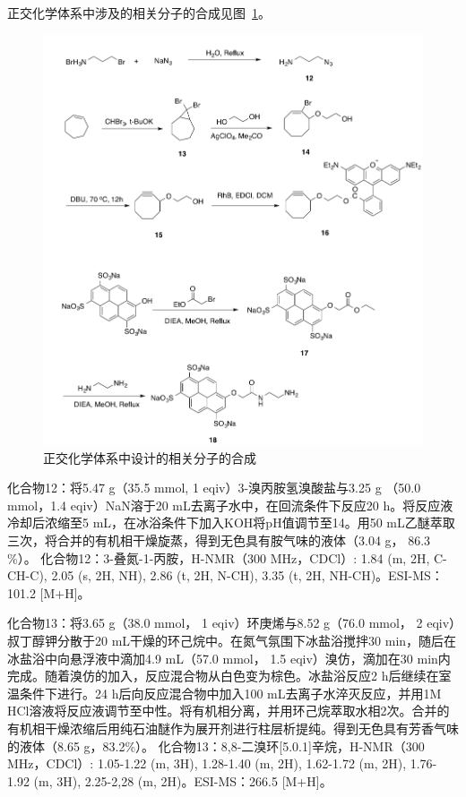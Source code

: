正交化学体系中涉及的相关分子的合成见图~\ref{fig:synth-orthognal}。
\begin{figure}[htbp]
  \centering
  \includegraphics[width=\linewidth]{figures/ch5/synth-orthognal.png}
  \caption{正交化学体系中设计的相关分子的合成}
  \label{fig:synth-orthognal}
\end{figure}

化合物12：将5.47 g（35.5 mmol, 1 eqiv）3-溴丙胺氢溴酸盐与3.25 g （50.0 mmol，1.4 eqiv）NaN溶于20 mL去离子水中，在回流条件下反应20 h。将反应液冷却后浓缩至5 mL，在冰浴条件下加入KOH将pH值调节至14。用50 mL乙醚萃取三次，将合并的有机相干燥旋蒸，得到无色具有胺气味的液体（3.04 g， 86.3 \%）。
化合物12：3-叠氮-1-丙胺，H-NMR（300 MHz，CDCl）: \text{$\delta$} 1.84 (m, 2H, C-CH-C), 2.05 (s, 2H, NH), 2.86 (t, 2H, N-CH), 3.35 (t, 2H, NH-CH)。ESI-MS：101.2 [M+H]\text{$^+$}。

化合物13：将3.65 g（38.0 mmol， 1 eqiv）环庚烯与8.52 g（76.0 mmol， 2 eqiv）叔丁醇钾分散于20 mL干燥的环己烷中。在氮气氛围下冰盐浴搅拌30 min，随后在冰盐浴中向悬浮液中滴加4.9 mL（57.0 mmol， 1.5 eqiv）溴仿，滴加在30 min内完成。随着溴仿的加入，反应混合物从白色变为棕色。冰盐浴反应2 h后继续在室温条件下进行。24 h后向反应混合物中加入100 mL去离子水淬灭反应，并用1M HCl溶液将反应液调节至中性。将有机相分离，并用环己烷萃取水相2次。合并的有机相干燥浓缩后用纯石油醚作为展开剂进行柱层析提纯。得到无色具有芳香气味的液体（8.65 g，83.2\%）。
化合物13：8,8-二溴环[5.0.1]辛烷，H-NMR（300 MHz，CDCl）: \text{$\delta$} 1.05-1.22 (m, 3H), 1.28-1.40 (m, 2H), 1.62-1.72 (m, 2H), 1.76-1.92 (m, 3H), 2.25-2,28 (m, 2H)。ESI-MS：266.5 [M+H]\text{$^+$}。

